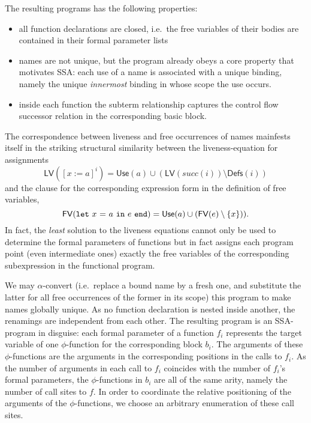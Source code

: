 The resulting programs has the following properties:
\begin{itemize}
\item all function declarations are closed, i.e.~the free variables of their bodies are contained in their formal parameter lists
\item names are not unique, but the program already obeys a core property
that motivates SSA: each use of a name is associated with a unique
binding, namely the unique \emph{innermost} binding in whose scope the
use occurs.
\item inside each function the subterm relationship captures the control flow successor relation in the corresponding basic block.
\end{itemize}
The correspondence between liveness and free occurrences of names
mainfests itself in the striking structural similarity between the
liveness-equation for assignments $$\mathsf{LV}([x:=a]^i) =
\mathsf{Use}(a) \cup (\mathsf{LV}(\mathit{succ}(i)) \setminus \mathsf{Defs}(i))$$ and the clause for the corresponding expression form %
in the definition of free variables,
$$\mathsf{FV}(\mathtt{let}\ {x}\ \mathtt{=}\ {a}\ \mathtt{in}\ {e}\ \mathtt{end}) = \mathsf{Use}(a) \cup (\mathsf{FV}(e) \setminus
\{x\})).$$ In fact, the
\emph{least} solution to the liveness equations cannot only be used to determine the formal parameters of functions but in fact assigns each program point (even
intermediate ones) exactly the free variables of the corresponding
subexpression in the functional program.

We may $\alpha$-convert (i.e.~replace a bound name by a fresh one, and
substitute the latter for all free occurrences of the former in its
scope) this program to make names globally unique. As no function
declaration is nested inside another, the renamings are independent
from each other.  The resulting program is an SSA-program in disguise:
each formal parameter of a function $f_i$ represents the target
variable of one $\phi$-function for the corresponding block $b_i$. The
arguments of these $\phi$-functions are the arguments in the
corresponding positions in the calls to $f_i$. As the number of
arguments in each call to $f_i$ coincides with the number of $f_i$'s
formal parameters, the $\phi$-functions in $b_i$ are all of the same
arity, namely the number of call sites to $f$. In order to coordinate
the relative positioning of the arguments of the $\phi$-functions, we
choose an arbitrary enumeration of these call sites. 


